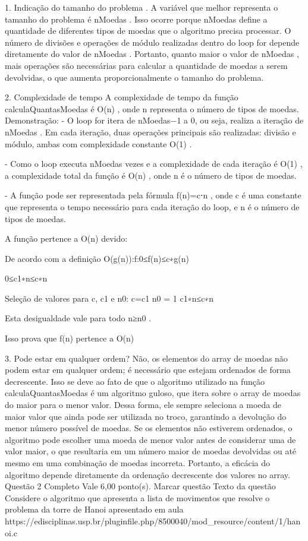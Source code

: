 1. Indicação do tamanho do problema
. A variável que melhor representa o tamanho do problema é nMoedas
. Isso ocorre porque nMoedas
 define a quantidade de diferentes tipos de moedas que o algoritmo precisa processar. O número de divisões e operações de módulo realizadas dentro do loop for
 depende diretamente do valor de nMoedas
. Portanto, quanto maior o valor de nMoedas
, mais operações são necessárias para calcular a quantidade de moedas a serem devolvidas, o que aumenta proporcionalmente o tamanho do problema.


2. Complexidade de tempo
A complexidade de tempo da função calculaQuantasMoedas
 é O(n)
, onde n
 representa o número de tipos de moedas. 
Demonstração:
- O loop for
 itera de nMoedas−1
 a 0, ou seja, realiza a iteração de nMoedas
. Em cada iteração, duas operações principais são realizadas: divisão e módulo, ambas com complexidade constante O(1)
. 

- Como o loop executa nMoedas
 vezes e a complexidade de cada iteração é O(1)
, a complexidade total da função é O(n)
, onde n
 é o número de tipos de moedas. 

- A função pode ser representada pela fórmula f(n)=c⋅n
, onde c
 é uma constante que representa o tempo necessário para cada iteração do loop, e n
 é o número de tipos de moedas.  


A função pertence a O(n)
 devido: 

De acordo com a definição O(g(n)):{f:0≤f(n)≤c∗g(n)}
 
0≤c1∗n≤c∗n

Seleção de valores para c, c1 e n0: c=c1 n0 = 1 c1∗n≤c∗n

Esta desigualdade vale para todo n≥n0
. 

Isso prova que f(n)
 pertence a O(n)



3. Pode estar em qualquer ordem?
Não, os elementos do array de moedas não podem estar em qualquer ordem; é necessário que estejam ordenados de forma decrescente. Isso se deve ao fato de que o algoritmo utilizado na função calculaQuantasMoedas
 é um algoritmo guloso, que itera sobre o array de moedas do maior para o menor valor. Dessa forma, ele sempre seleciona a moeda de maior valor que ainda pode ser utilizada no troco, garantindo a devolução do menor número possível de moedas. Se os elementos não estiverem ordenados, o algoritmo pode escolher uma moeda de menor valor antes de considerar uma de valor maior, o que resultaria em um número maior de moedas devolvidas ou até mesmo em uma combinação de moedas incorreta. Portanto, a eficácia do algoritmo depende diretamente da ordenação decrescente dos valores no array.
Questão 2
Completo
Vale 6,00 ponto(s).
Marcar questão
Texto da questão
Considere o algoritmo que apresenta a lista de movimentos que resolve o problema da torre de Hanoi apresentado em aula https://edisciplinas.usp.br/pluginfile.php/8500040/mod_resource/content/1/hanoi.c

